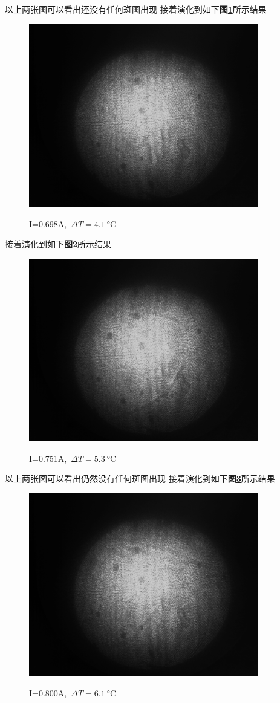\documentclass[a4paper]{article}
\begin{document}
以上两张图可以看出还没有任何斑图出现
\newpage
接着演化到如下\textbf{图\ref{result:fig3}}所示结果 
\begin{figure}[H]
 \centering
 \caption{I=0.698A,\ $\Delta T=\SI{4.1}{\celsius}$}
 \includegraphics[height=8cm, width=10cm]{images/27.3_31.4_0.698_3.40.bmp}
 \label{result:fig3}
\end{figure}
接着演化到如下\textbf{图\ref{result:fig4}}所示结果
\begin{figure}[H]
 \centering
 \caption{I=0.751A,\ $\Delta T=\SI{5.3}{\celsius}$}
 \includegraphics[height=8cm, width=10cm]{images/28.1_33.4_0.751_3.50.bmp}
 \label{result:fig4}
\end{figure}
以上两张图可以看出仍然没有任何斑图出现
\newpage
接着演化到如下\textbf{图\ref{result:fig5}}所示结果
\begin{figure}[H]
 \centering
 \caption{I=0.800A,\ $\Delta T=\SI{6.1}{\celsius}$}
 \includegraphics[height=8cm, width=10cm]{images/28.9_35.0_0.800_4.00.bmp}
 \label{result:fig5}
\end{figure}
\end{document}
